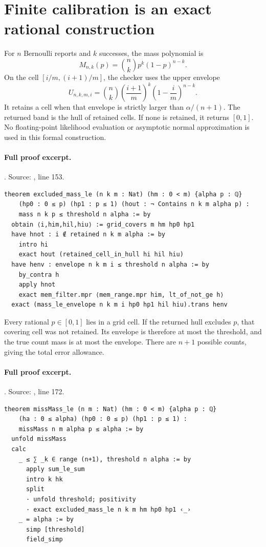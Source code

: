 \documentclass[11pt]{article}
\begin{document}
\section{Finite calibration is an exact rational construction}
\label{sec:calibration}
For $n$ Bernoulli reports and $k$ successes, the mass polynomial is
\[
 M_{n,k}(p)=\binom nk p^k(1-p)^{n-k}.
\]
On the cell $[i/m,(i+1)/m]$, the checker uses the upper envelope
\[
 U_{n,k,m,i}=\binom nk\left(\frac{i+1}{m}\right)^k
              \left(1-\frac{i}{m}\right)^{n-k}.
\]
It retains a cell when that envelope is strictly larger than
$\alpha/(n+1)$. The returned band is the hull of retained cells. If none is
retained, it returns $[0,1]$. No floating-point likelihood evaluation or
asymptotic normal approximation is used in this formal construction.

\paragraph{Full proof excerpt.}. Source: , line 153.
\begin{lstlisting}[style=AVOCSource]
theorem excluded_mass_le (n k m : Nat) (hm : 0 < m) {alpha p : ℚ}
    (hp0 : 0 ≤ p) (hp1 : p ≤ 1) (hout : ¬ Contains n k m alpha p) :
    mass n k p ≤ threshold n alpha := by
  obtain ⟨i,him,hil,hiu⟩ := grid_covers m hm hp0 hp1
  have hnot : i ∉ retained n k m alpha := by
    intro hi
    exact hout (retained_cell_in_hull hi hil hiu)
  have henv : envelope n k m i ≤ threshold n alpha := by
    by_contra h
    apply hnot
    exact mem_filter.mpr ⟨mem_range.mpr him, lt_of_not_ge h⟩
  exact (mass_le_envelope n k m i hp0 hp1 hil hiu).trans henv
\end{lstlisting}


Every rational $p\in[0,1]$ lies in a grid cell. If the returned hull excludes
$p$, that covering cell was not retained. Its envelope is therefore at most
the threshold, and the true count mass is at most the envelope. There are
$n+1$ possible counts, giving the total error allowance.

\paragraph{Full proof excerpt.}. Source: , line 172.
\begin{lstlisting}[style=AVOCSource]
theorem missMass_le (n m : Nat) (hm : 0 < m) {alpha p : ℚ}
    (ha : 0 ≤ alpha) (hp0 : 0 ≤ p) (hp1 : p ≤ 1) :
    missMass n m alpha p ≤ alpha := by
  unfold missMass
  calc
    _ ≤ ∑ _k ∈ range (n+1), threshold n alpha := by
      apply sum_le_sum
      intro k hk
      split
      · unfold threshold; positivity
      · exact excluded_mass_le n k m hm hp0 hp1 ‹_›
    _ = alpha := by
      simp [threshold]
      field_simp
\end{lstlisting}
\end{document}
